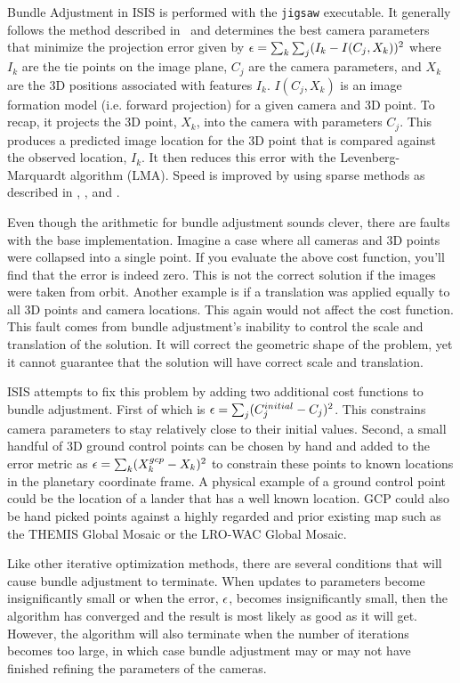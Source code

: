 Bundle Adjustment in \ac{ISIS} is performed with the \texttt{jigsaw}
executable. It generally follows the method described
in~\cite{triggs00} and determines the best camera parameters that
minimize the projection error given by ${\bf \epsilon} =
\sum_k\sum_j(I_k-I(C_j, X_k))^2$ where $I_k$ are the tie points on the
image plane, $C_j$ are the camera parameters, and $X_k$ are the 3D
positions associated with features $I_k$. $I(C_j, X_k)$ is an image
formation model (i.e. forward projection) for a given camera and 3D
point. To recap, it projects the 3D point, $X_k$, into the camera with
parameters $C_j$. This produces a predicted image location for the 3D
point that is compared against the observed location, $I_k$. It then
reduces this error with the Levenberg-Marquardt algorithm (LMA). Speed
is improved by using sparse methods as described in \citet{hartley04},
\citet{konolige:sparsesparse}, and \citet{cholmod}.

Even though the arithmetic for bundle adjustment sounds clever, there
are faults with the base implementation. Imagine a case where all
cameras and 3D points were collapsed into a single point. If you
evaluate the above cost function, you'll find that the error is indeed
zero. This is not the correct solution if the images were taken
from orbit. Another example is if a translation was applied equally to
all 3D points and camera locations. This again would not affect the
cost function. This fault comes from bundle adjustment's inability to
control the scale and translation of the solution. It will correct the
geometric shape of the problem, yet it cannot guarantee that the solution
will have correct scale and translation.

\ac{ISIS} attempts to fix this problem by adding two additional cost
functions to bundle adjustment. First of which is ${\bf \epsilon} =
\sum_j(C_j^{initial}-C_j)^2$. This constrains camera parameters to
stay relatively close to their initial values. Second, a small handful
of 3D ground control points can be chosen by hand and added to the
error metric as ${\bf \epsilon} = \sum_k(X_k^{gcp}-X_k)^2$ to
constrain these points to known locations in the planetary coordinate
frame. A physical example of a ground control point could be the
location of a lander that has a well known location. GCP could also be
hand picked points against a highly regarded and prior existing map
such as the THEMIS Global Mosaic or the LRO-WAC Global Mosaic.

Like other iterative optimization methods, there are several
conditions that will cause bundle adjustment to terminate. When
updates to parameters become insignificantly small or when the error,
${\bf \epsilon}$, becomes insignificantly small, then the algorithm
has converged and the result is most likely as good as it will get.
However, the algorithm will also terminate when the number of
iterations becomes too large, in which case bundle adjustment may or
may not have finished refining the parameters of the cameras.


